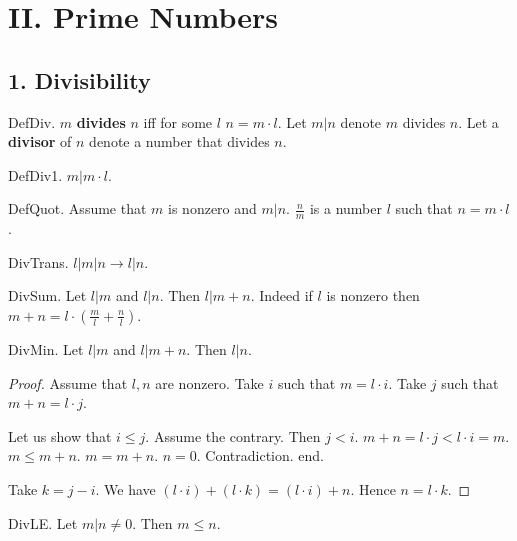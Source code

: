 \section{II. Prime Numbers}

\subsection{1. Divisibility}


\begin{definition} DefDiv.
$m$ {\bf divides} $n$ iff for some $l$ $n = m \cdot l$.
Let $m | n$ denote $m$ divides $n$.
Let a {\bf divisor} of $n$ denote a number that divides $n$.
\end{definition}

\begin{lemma} DefDiv1.
$m | m \cdot l $.
\end{lemma}

\begin{definition} DefQuot.
Assume that $m$ is nonzero and $m | n$.
$\frac{n}{m}$ is a number $l$ such that $n = m \cdot l$.
\end{definition}

\begin{lemma} DivTrans. $l | m | n \rightarrow l | n$.
\end{lemma}

\begin{lemma} DivSum.
Let $l | m$ and $l | n$. Then $l | m + n$.
Indeed if $l$ is nonzero then 
$m + n = l \cdot (\frac{m}{l} + \frac{n}{l})$.
\end{lemma}

\begin{lemma} DivMin.
Let $l | m$ and $l | m + n$. Then $l | n$.
\end{lemma}
\begin{proof}
Assume that $l,n$ are nonzero.
Take $i$ such that $m = l \cdot i$. 
Take $j$ such that $m + n = l \cdot j$.

Let us show that $i \leq j$.
Assume the contrary. Then $j < i$.
$m+n = l \cdot j < l \cdot i = m$. 
$m \leq m+n$.
$m = m+n$. $n=0$.
Contradiction. end.
 
Take $k = j - i$.
We have $(l \cdot i) + (l \cdot k) = (l \cdot i) + n$.
Hence $n = l \cdot k$.
\end{proof}

\begin{lemma} DivLE.
Let $m | n \neq 0$. Then $m \leq n$.
\end{lemma}

